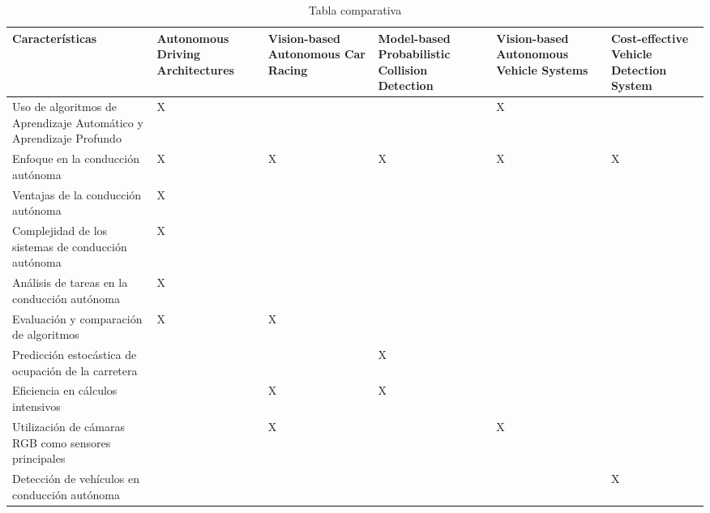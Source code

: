 \documentclass[10pt,letterpaper,final]{article}
\begin{document}
    \begin{table}
        \centering
        \caption{Tabla comparativa}
        \begin{tabular}{|p{4cm}|p{2cm}|p{2cm}|p{2cm}|p{2cm}|p{2cm}|}
            \hline
            \textbf{Características}
            & \textbf{Autonomous Driving Architectures \cite{bachute2021autonomous}}
            & \textbf{Vision-based Autonomous Car Racing \cite{cai2021vision}}
            & \textbf{Model-based Probabilistic Collision Detection \cite{althoff2009model}}
            & \textbf{Vision-based Autonomous Vehicle Systems \cite{pavel2022vision}}
            & \textbf{Cost-effective Vehicle Detection System \cite{alam2022cost}} \\
            \hline
            Uso de algoritmos de Aprendizaje Automático y Aprendizaje Profundo & X &   &   & X &   \\
            \hline
            Enfoque en la conducción autónoma                                  & X & X & X & X & X \\
            \hline
            Ventajas de la conducción autónoma                                 & X &   &   &   &   \\
            \hline
            Complejidad de los sistemas de conducción autónoma                 & X &   &   &   &   \\
            \hline
            Análisis de tareas en la conducción autónoma                       & X &   &   &   &   \\
            \hline
            Evaluación y comparación de algoritmos                             & X & X &   &   &   \\
            \hline
            Predicción estocástica de ocupación de la carretera                &   &   & X &   &   \\
            \hline
            Eficiencia en cálculos intensivos                                  &   & X & X &   &   \\
            \hline
            Utilización de cámaras RGB como sensores principales               &   & X &   & X &   \\
            \hline
            Detección de vehículos en conducción autónoma                      &   &   &   &   & X \\
            \hline
        \end{tabular}
    \end{table}
    \clearpage
\end{document}
